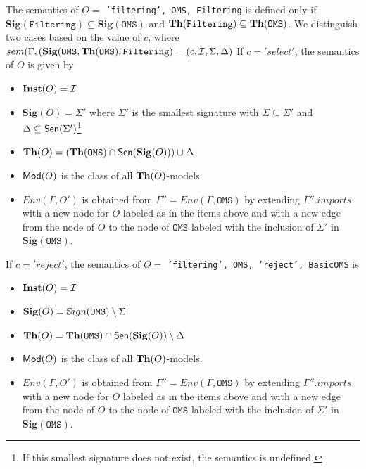 \documentclass[10pt,fleqn,%
\ifpretendfinal
final%
\else
draft%
\fi,
]{scrreprt}
\newcommand*{\syntax}[1]{\texttt{#1}}
\newcommand{\Sig}{\mathbf{Sig}}
\newcommand{\Inst}{\ensuremath{\mathbf{Inst}}}
\begin{document}
The semantics of $O =$ 
\syntax{'filtering', OMS, Filtering} 
is
defined only if  $\Sig(\syntax{Filtering})\subseteq\Sig(\syntax{OMS})$ and $\Th(\syntax{Filtering})\subseteq\Th(\syntax{OMS})$.
We distinguish two cases based on the value of $c$, 
where $sem(\Gamma, (\Sig(\syntax{OMS}, \Th(\syntax{OMS}), \syntax{Filtering})
= (c, \cI, \Sigma, \Delta)$ 
If $c = 'select'$, 
the semantics of $O$ is given by
\begin{itemize}
  \item $\Inst(O) = \cI$
  \item $\Sig(O) = \Sigma'$ where $\Sigma'$ is the smallest signature
with $\Sigma\subseteq\Sigma'$ and $\Delta\subseteq\mathsf{Sen}(\Sigma')$\footnote
{If this smallest signature does not exist, the semantics is undefined.}
  \item $\Th(O) = (\Th(\syntax{OMS})\cap\Sen(\Sig(O)))\cup\Delta$
  \item $\mathsf{Mod}(O)$ is the class of all $\mathbf{Th}(O)$-models.
  \item $Env(\Gamma, O')$ is obtained from 
       $\Gamma'' = Env(\Gamma, \syntax{OMS})$
       by extending $\Gamma''.imports$
       with a new node for $O$ labeled as in the items above and
       with a new edge from the node of $O$ to the node of $\syntax{OMS}$
        labeled with the inclusion of $\Sigma'$ in $\Sig(\syntax{OMS})$.
\end{itemize}

\noindent
If $c = 'reject'$, the semantics of $O =$
\syntax{'filtering', OMS, 'reject', BasicOMS} is
\begin{itemize}
  \item $\Inst(O) = \cI$
  \item $\Sig(O) = \Sign(\syntax{OMS})\setminus \Sigma$ 
  \item $\Th(O) = \Th(\syntax{OMS})\cap\Sen(\Sig(O))\setminus\Delta$
  \item $\mathsf{Mod}(O)$ is the class of all $\mathbf{Th}(O)$-models.
    \item $Env(\Gamma, O')$ is obtained from 
       $\Gamma'' = Env(\Gamma, \syntax{OMS})$
       by extending $\Gamma''.imports$
       with a new node for $O$ labeled as in the items above and
       with a new edge from the node of $O$ to the node of $\syntax{OMS}$
        labeled with the inclusion of $\Sigma'$ in $\Sig(\syntax{OMS})$.
\end{itemize}

\end{document}
